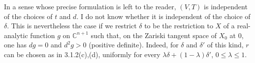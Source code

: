 In a sense whose precise formulation is left to the reader, $(V,T)$
is independent of the choices of $t$ and $d$.  I do not know whether
it is independent of the choice of $\delta$.  This is nevertheless
the case if we restrict $\delta$ to be the restriction to $X$ of a
real-analytic function $g$ on $\mathbb C^{n+1}$ such that, on the
Zariski tangent space of $X_0$ at $0$, one has $dg=0$ and $d^2g>0$
(positive definite).  Indeed, for $\delta$ and $\delta'$ of this
kind, $r$ can be chosen as in 3.1.2(c),(d), uniformly for every
$\lambda\delta+(1-\lambda)\delta'$, $0\leq\lambda\leq1$.

